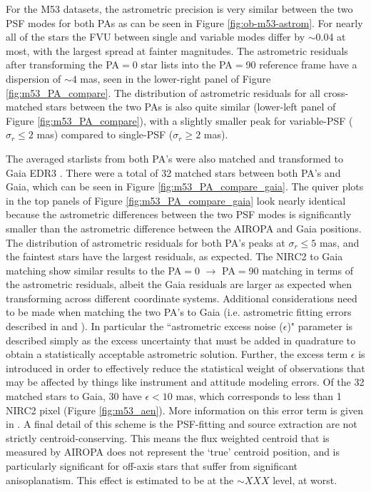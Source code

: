 \documentclass[]{spie}  %
\begin{document}
For the M53 datasets, the astrometric precision is very similar between the two PSF modes for both PAs as can be seen in Figure \ref{fig:ob-m53-astrom}. For nearly all of the stars the FVU between single and variable modes differ by ${\sim}$0.04 at most, with the largest spread at fainter magnitudes. The astrometric residuals after transforming the PA$=$0 star lists into the PA$=$90 reference frame have a dispersion of ${\sim}4$ mas, seen in the lower-right panel of Figure \ref{fig:m53_PA_compare}. The distribution of astrometric residuals for all cross-matched stars between the two PAs is also quite similar (lower-left panel of Figure \ref{fig:m53_PA_compare}), with a slightly smaller peak for variable-PSF ($\sigma_{r}\leq2$ mas) compared to single-PSF ($\sigma_{r}\geq2$ mas). 

The averaged starlists from both PA's were also matched and transformed to Gaia EDR3 \citep{brown:2021a}. There were a total of 32 matched stars between both PA's and Gaia, which can be seen in Figure \ref{fig:m53_PA_compare_gaia}. The quiver plots in the top panels of Figure \ref{fig:m53_PA_compare_gaia} look nearly identical because the astrometric differences between the two PSF modes is significantly smaller than the astrometric difference between the AIROPA and Gaia positions. The distribution of astrometric residuals for both PA's peaks at $\sigma_{r}\leq5$ mas, and the faintest stars have the largest residuals, as expected. The NIRC2 to Gaia matching show similar results to the PA$=$0 $\rightarrow$ PA$=$90 matching in terms of the astrometric residuals, albeit the Gaia residuals are larger as expected when transforming across different coordinate systems. Additional considerations need to be made when matching the two PA's to Gaia (i.e. astrometric fitting errors described in \cite{brown:2018a} and \cite{brown:2021a}). In particular the ``astrometric excess noise ($\epsilon$)" parameter is described simply as the excess uncertainty that must be added in quadrature to obtain a statistically acceptable astrometric solution. Further, the excess term $\epsilon$ is introduced in order to effectively reduce the statistical weight of observations that may be affected by things like instrument and attitude modeling errors. Of the 32 matched stars to Gaia, 30 have $\epsilon <  10$ mas, which corresponds to less than 1 NIRC2 pixel (Figure \ref{fig:m53_aen}). More information on this error term is given in \cite{lindegren:2012a}. A final detail of this scheme is the PSF-fitting and source extraction are not strictly centroid-conserving. This means the flux weighted centroid that is measured by AIROPA does not represent the `true' centroid position, and is particularly significant for off-axis stars that suffer from significant anisoplanatism. This effect is estimated to be at the $\sim XXX$ level, at worst.
\end{document}
